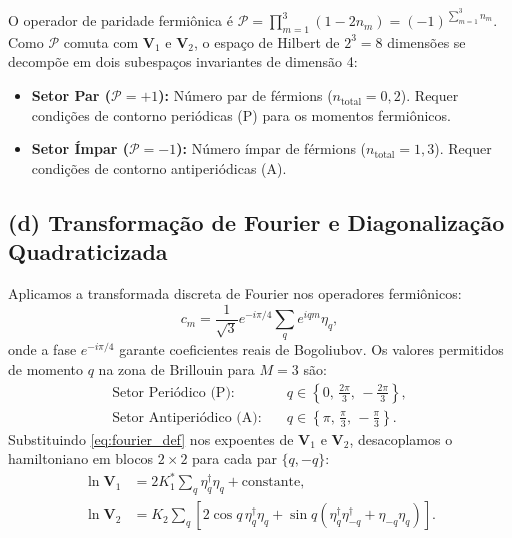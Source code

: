 \documentclass[11pt,a4paper]{article}
\begin{document}
%
O operador de paridade fermiônica é $\mathcal{P} = \prod_{m=1}^{3} (1 - 2n_m) = (-1)^{\sum_{m=1}^3 n_m}$. Como $\mathcal{P}$ comuta com $\mathbf{V}_1$ e $\mathbf{V}_2$, o espaço de Hilbert de $2^3 = 8$ dimensões se decompõe em dois subespaços invariantes de dimensão 4:
%
\begin{itemize}
    \item \textbf{Setor Par ($\mathcal{P} = +1$):} Número par de férmions ($n_{\text{total}} = 0, 2$). Requer condições de contorno periódicas (P) para os momentos fermiônicos.
    \item \textbf{Setor Ímpar ($\mathcal{P} = -1$):} Número ímpar de férmions ($n_{\text{total}} = 1, 3$). Requer condições de contorno antiperiódicas (A).
\end{itemize}
%
\subsection*{(d) Transformação de Fourier e Diagonalização Quadraticizada}
%
Aplicamos a transformada discreta de Fourier nos operadores fermiônicos:
%
\begin{equation}
    c_m = \frac{1}{\sqrt{3}} e^{-i\pi/4} \sum_q e^{iqm} \eta_q,
    \label{eq:fourier_def}
\end{equation}
%
onde a fase $e^{-i\pi/4}$ garante coeficientes reais de Bogoliubov. Os valores permitidos de momento $q$ na zona de Brillouin para $M=3$ são:
%
\begin{align}
    \text{Setor Periódico (P):} \quad & q \in \left\{ 0, \, \frac{2\pi}{3}, \, -\frac{2\pi}{3} \right\}, \label{eq:q_P_vals} \\
    \text{Setor Antiperiódico (A):} \quad & q \in \left\{ \pi, \, \frac{\pi}{3}, \, -\frac{\pi}{3} \right\}. \label{eq:q_A_vals}
\end{align}
%
Substituindo \eqref{eq:fourier_def} nos expoentes de $\mathbf{V}_1$ e $\mathbf{V}_2$, desacoplamos o hamiltoniano em blocos $2 \times 2$ para cada par $\{q, -q\}$:
%
\begin{align}
    \ln \mathbf{V}_1 &= 2K_1^* \sum_q \eta_q^\dagger \eta_q + \text{constante}, \\
    \ln \mathbf{V}_2 &= K_2 \sum_q \left[ 2\cos q \, \eta_q^\dagger \eta_q + \sin q \left( \eta_q^\dagger \eta_{-q}^\dagger + \eta_{-q} \eta_q \right) \right].
\end{align}
%
\end{document}
